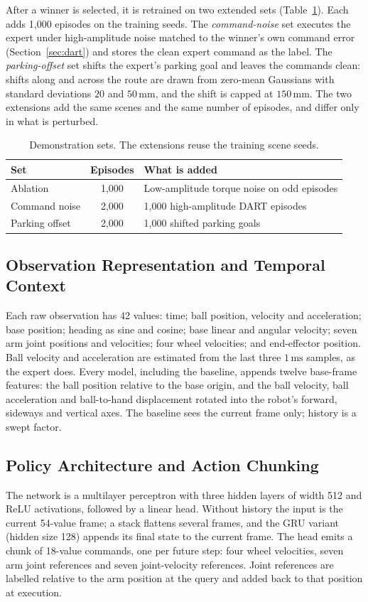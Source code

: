 \documentclass[conference]{IEEEtran}
\begin{document}
After a winner is selected, it is retrained on two extended sets (Table~\ref{tab:datasets}). Each adds 1,000 episodes on the training seeds. The \emph{command-noise} set executes the expert under high-amplitude noise matched to the winner's own command error (Section~\ref{sec:dart}) and stores the clean expert command as the label. The \emph{parking-offset} set shifts the expert's parking goal and leaves the commands clean: shifts along and across the route are drawn from zero-mean Gaussians with standard deviations $20$ and $50\,\mathrm{mm}$, and the shift is capped at $150\,\mathrm{mm}$. The two extensions add the same scenes and the same number of episodes, and differ only in what is perturbed.

\begin{table}[t]
\centering
\caption{Demonstration sets. The extensions reuse the training scene seeds.}
\label{tab:datasets}
\footnotesize
\begin{tabular}{lcl}
\toprule
Set & Episodes & What is added \\
\midrule
Ablation & 1,000 & Low-amplitude torque noise on odd episodes \\
Command noise & 2,000 & 1,000 high-amplitude DART episodes \\
Parking offset & 2,000 & 1,000 shifted parking goals \\
\bottomrule
\end{tabular}
\end{table}

\subsection{Observation Representation and Temporal Context}
Each raw observation has 42 values: time; ball position, velocity and acceleration; base position; heading as sine and cosine; base linear and angular velocity; seven arm joint positions and velocities; four wheel velocities; and end-effector position. Ball velocity and acceleration are estimated from the last three $1\,\mathrm{ms}$ samples, as the expert does. Every model, including the baseline, appends twelve base-frame features: the ball position relative to the base origin, and the ball velocity, ball acceleration and ball-to-hand displacement rotated into the robot's forward, sideways and vertical axes. The baseline sees the current frame only; history is a swept factor.

\subsection{Policy Architecture and Action Chunking}
The network is a multilayer perceptron with three hidden layers of width 512 and ReLU activations, followed by a linear head. Without history the input is the current 54-value frame; a stack flattens several frames, and the GRU variant (hidden size 128) appends its final state to the current frame. The head emits a chunk of 18-value commands, one per future step: four wheel velocities, seven arm joint references and seven joint-velocity references. Joint references are labelled relative to the arm position at the query and added back to that position at execution.
\end{document}
